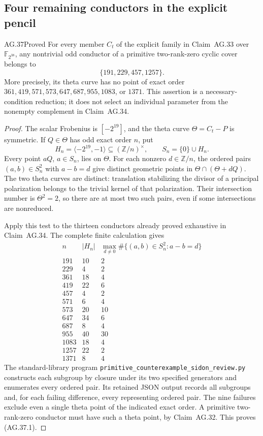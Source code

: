 \subsection{Four remaining conductors in the explicit pencil}

\begin{claim}{AG.37}{Proved}\label{clm:AGsidonfour}
For every member \(C_t\) of the explicit family in
Claim~AG.33 over
\(\mathbb F_{2^{38}}\), any nontrivial odd conductor of a
primitive two-rank-zero cyclic cover belongs to
\[
                         \{191,229,457,1257\}.
                                                        \tag{AG.37.1}
\]
More precisely, its theta curve has no point of exact order
\(361,419,571,573,647,687,955,1083\), or \(1371\).
This assertion is a necessary-condition reduction; it does not select
an individual parameter from the nonempty complement in Claim~AG.34.
\end{claim}

\begin{proof}
The scalar Frobenius is \([-2^{19}]\), and the theta curve
\(\Theta=C_t-P\) is symmetric. If \(Q\in\Theta\) has odd
exact order \(n\), put
\[
 H_n=\langle-2^{19},-1\rangle\subseteq(\mathbb Z/n)^\times,
 \qquad S_n=\{0\}\cup H_n.
\]
Every point \(aQ\), \(a\in S_n\), lies on \(\Theta\).
For each nonzero \(d\in\mathbb Z/n\), the ordered pairs
\((a,b)\in S_n^2\) with \(a-b=d\) give distinct geometric
points in \(\Theta\cap(\Theta+dQ)\). The two theta curves
are distinct: translation stabilizing the divisor of a principal
polarization belongs to the trivial kernel of that polarization.
Their intersection number is \(\Theta^2=2\), so there are at
most two such pairs, even if some intersections are nonreduced.

Apply this test to the thirteen conductors already proved exhaustive
in Claim~AG.34. The complete finite calculation gives
\[
\begin{array}{r|r|r}
 n&|H_n|&\max_{d\ne0}\#\{(a,b)\in S_n^2:a-b=d\}\\\hline
 191&10&2\\229&4&2\\361&18&4\\419&22&6\\457&4&2\\
 571&6&4\\573&20&10\\647&34&6\\687&8&4\\955&40&30\\
 1083&18&4\\1257&22&2\\1371&8&4
\end{array}
\]
The standard-library program
\texttt{primitive\_counterexample\_sidon\_review.py}
constructs each subgroup by closure under its two specified generators
and enumerates every ordered pair. Its retained JSON output records
all subgroups and, for each failing difference, every representing
ordered pair. The nine failures exclude even a single theta point of
the indicated exact order. A primitive two-rank-zero conductor must
have such a theta point, by Claim~AG.32. This proves (AG.37.1).
\end{proof}
